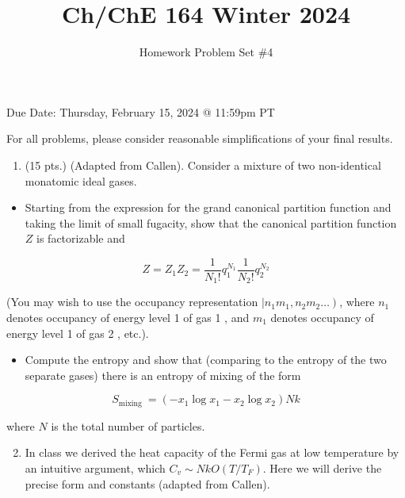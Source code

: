 \documentclass[10pt]{article}
\title{Ch/ChE 164 Winter 2024 }
\author{Homework Problem Set \#4}
\date{}
\begin{document}
\maketitle
Due Date: Thursday, February 15, 2024 @ 11:59pm PT

For all problems, please consider reasonable simplifications of your final results.

\begin{enumerate}
  \item (15 pts.) (Adapted from Callen). Consider a mixture of two non-identical monatomic ideal gases.
\end{enumerate}

\begin{itemize}
  \item Starting from the expression for the grand canonical partition function and taking the limit of small fugacity, show that the canonical partition function $Z$ is factorizable and
\end{itemize}


\begin{equation*}
Z=Z_{1} Z_{2}=\frac{1}{N_{1} !} q_{1}^{N_{1}} \frac{1}{N_{2} !} q_{2}^{N_{2}} \tag{1}
\end{equation*}


(You may wish to use the occupancy representation $\left.\mid n_{1} m_{1}, n_{2} m_{2} \ldots\right)$, where $n_{1}$ denotes occupancy of energy level 1 of gas 1 , and $m_{1}$ denotes occupancy of energy level 1 of gas 2 , etc.).

\begin{itemize}
  \item Compute the entropy and show that (comparing to the entropy of the two separate gases) there is an entropy of mixing of the form
\end{itemize}


\begin{equation*}
S_{\text {mixing }}=\left(-x_{1} \log x_{1}-x_{2} \log x_{2}\right) N k \tag{2}
\end{equation*}


where $N$ is the total number of particles.

\begin{enumerate}
  \setcounter{enumi}{1}
  \item In class we derived the heat capacity of the Fermi gas at low temperature by an intuitive argument, which $C_{v} \sim N k O\left(T / T_{F}\right)$. Here we will derive the precise form and constants (adapted from Callen).
\end{enumerate}
\end{document}
